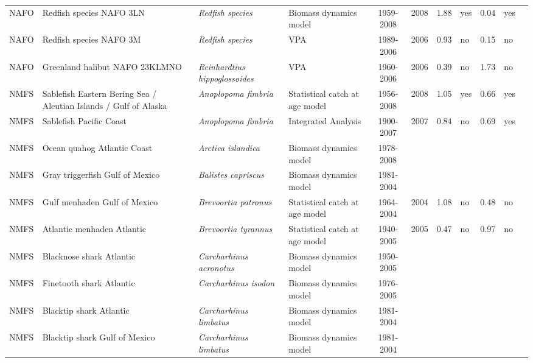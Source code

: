 \begin{longtable}{p{1.8cm}p{3.5cm}p{3.5cm}p{3cm}cccp{0.9cm}cp{0.9cm}c}
  NAFO & Redfish species NAFO 3LN & \textit{Redfish species} & Biomass dynamics model & 1959-2008 & 2008 & 1.88 & yes & 0.04 & yes & \cite{NAFO-3LN-Redfishspp-2008.pdf} \\ 
  NAFO & Redfish species NAFO 3M & \textit{Redfish species} & VPA & 1989-2006 & 2006 & 0.93 & no & 0.15 & no & \cite{NAFO-RED3M-2007.pdf} \\ 
  NAFO & Greenland halibut NAFO 23KLMNO & \textit{Reinhardtius hippoglossoides} & VPA & 1960-2006 & 2006 & 0.39 & no & 1.73 & no & \cite{NAFO-GHAL23KLMNO-2007.pdf} \\ 
  NMFS & Sablefish Eastern Bering Sea / Aleutian Islands / Gulf of Alaska & \textit{Anoplopoma fimbria} & Statistical catch at age model & 1956-2008 & 2008 & 1.05 & yes & 0.66 & yes & \cite{AFSC-SABLEFEBSAIGA-2008-Sablefish-EBS-AI-GA.pdf} \\ 
  NMFS & Sablefish Pacific Coast & \textit{Anoplopoma fimbria} & Integrated Analysis & 1900-2007 & 2007 & 0.84 & no & 0.69 & yes & \cite{NWFSC-SABLEFPCOAST-2007-Sablefish.pdf} \\ 
  NMFS & Ocean quahog Atlantic Coast & \textit{Arctica islandica} & Biomass dynamics model & 1978-2008 &  &  &  &  &  & \cite{quahog.pdf} \\ 
  NMFS & Gray triggerfish Gulf of Mexico & \textit{Balistes capriscus} & Biomass dynamics model & 1981-2004 &  &  &  &  &  & \cite{JENSEN_GTRIGGM_2006.pdf} \\ 
  NMFS & Gulf menhaden Gulf of Mexico & \textit{Brevoortia patronus} & Statistical catch at age model & 1964-2004 & 2004 & 1.08 & no & 0.48 & no & \cite{GILROY-MENHADENGM-2007.pdf} \\ 
  NMFS & Atlantic menhaden Atlantic & \textit{Brevoortia tyrannus} & Statistical catch at age model & 1940-2005 & 2005 & 0.47 & no & 0.97 & no & \cite{Atl.Menhaden-ASMFC-2006.pdf} \\ 
  NMFS & Blacknose shark Atlantic & \textit{Carcharhinus acronotus} & Biomass dynamics model & 1950-2005 &  &  &  &  &  & \cite{SmallcoastalAtl2007-SEFSC.pdf} \\ 
  NMFS & Finetooth shark Atlantic & \textit{Carcharhinus isodon} & Biomass dynamics model & 1976-2005 &  &  &  &  &  & \cite{SmallcoastalAtl2007-SEFSC.pdf} \\ 
  NMFS & Blacktip shark Atlantic & \textit{Carcharhinus limbatus} & Biomass dynamics model & 1981-2004 &  &  &  &  &  & \cite{LargeCoastalAtl2006-SEFSC.pdf} \\ 
  NMFS & Blacktip shark Gulf of Mexico & \textit{Carcharhinus limbatus} & Biomass dynamics model & 1981-2004 &  &  &  &  &  & \cite{LargeCoastalAtl2006-SEFSC.pdf} \\ 

\end{longtable}
